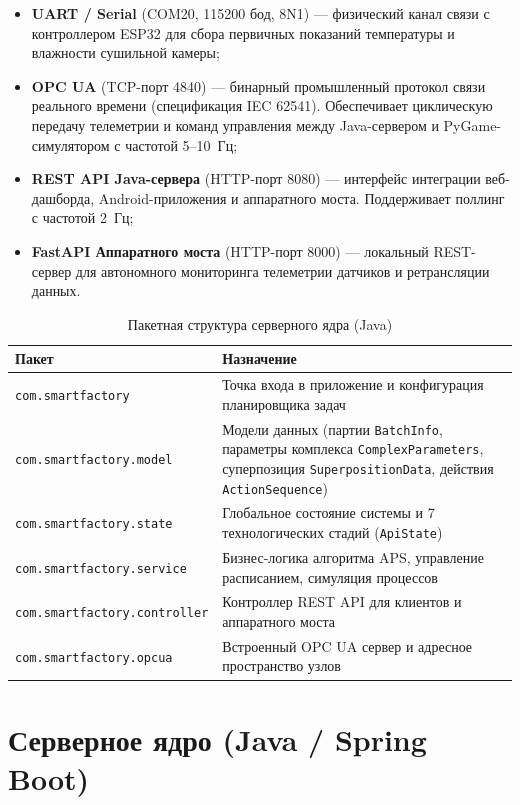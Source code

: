 \documentclass[14pt, a4paper]{extarticle}
\begin{document}
\begin{itemize}
    \item \textbf{UART / Serial} (COM20, 115200 бод, 8N1) --- физический канал связи с контроллером ESP32 для сбора первичных показаний температуры и влажности сушильной камеры;
    \item \textbf{OPC UA} (TCP-порт 4840) --- бинарный промышленный протокол связи реального времени (спецификация IEC 62541). Обеспечивает циклическую передачу телеметрии и команд управления между Java-сервером и PyGame-симулятором с частотой 5--10~Гц;
    \item \textbf{REST API Java-сервера} (HTTP-порт 8080) --- интерфейс интеграции веб-дашборда, Android-приложения и аппаратного моста. Поддерживает поллинг с частотой 2~Гц;
    \item \textbf{FastAPI Аппаратного моста} (HTTP-порт 8000) --- локальный REST-сервер для автономного мониторинга телеметрии датчиков и ретрансляции данных.
\end{itemize}

\begin{table}[h!]
\centering
\caption{Пакетная структура серверного ядра (Java)}
\begin{tabularx}{\textwidth}{|l|X|}
\hline
\textbf{Пакет} & \textbf{Назначение} \\
\hline
\texttt{com.smartfactory} & Точка входа в приложение и конфигурация планировщика задач \\
\texttt{com.smartfactory.model} & Модели данных (партии \texttt{BatchInfo}, параметры комплекса \texttt{ComplexParameters}, суперпозиция \texttt{SuperpositionData}, действия \texttt{ActionSequence}) \\
\texttt{com.smartfactory.state} & Глобальное состояние системы и 7 технологических стадий (\texttt{ApiState}) \\
\texttt{com.smartfactory.service} & Бизнес-логика алгоритма APS, управление расписанием, симуляция процессов \\
\texttt{com.smartfactory.controller} & Контроллер REST API для клиентов и аппаратного моста \\
\texttt{com.smartfactory.opcua} & Встроенный OPC UA сервер и адресное пространство узлов \\
\hline
\end{tabularx}
\end{table}

\newpage
\section{Серверное ядро (Java / Spring Boot)}
\end{document}
